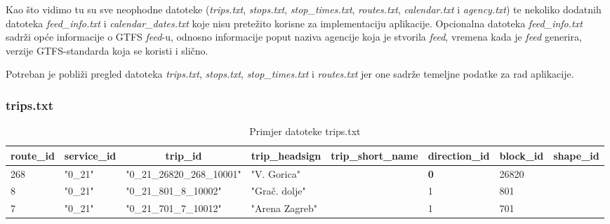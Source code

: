 \documentclass[zavrsnirad]{fer}
\begin{document}
Kao što vidimo tu su sve neophodne datoteke (\textit{trips.txt}, \textit{stops.txt}, \textit{stop\_times.txt}, \newline\textit{routes.txt}, \textit{calendar.txt} i \textit{agency.txt}) te nekoliko dodatnih datoteka \textit{feed\_info.txt} i \newline\textit{calendar\_dates.txt} koje nisu pretežito korisne za implementaciju aplikacije. Opcionalna datoteka \textit{feed\_info.txt} sadrži opće informacije o GTFS \textit{feed}-u, odnosno  informacije poput naziva agencije koja je stvorila \textit{feed}, vremena kada je \textit{feed} generira, verzije GTFS-standarda koja se koristi i slično.

Potreban je pobliži pregled datoteka \textit{trips.txt}, \textit{stops.txt}, \textit{stop\_times.txt} i \textit{routes.txt} jer one sadrže temeljne podatke za rad aplikacije.

\subsubsection{trips.txt}

\begin{table}[htb]
	\begin{adjustbox}{width=\columnwidth,center}
	\begin{tabular}{l|l|l|l|l|l|l|l}
		\hline
		\multicolumn{1}{c|}{\textbf{route\_id}} & \multicolumn{1}{c|}{\textbf{service\_id}} & \multicolumn{1}{c|}{\textbf{trip\_id}} & \multicolumn{1}{c|}{\textbf{trip\_headsign}} & \multicolumn{1}{c|}{\textbf{trip\_short\_name}} & \multicolumn{1}{c|}{\textbf{direction\_id}} & \multicolumn{1}{c|}{\textbf{block\_id}} & \multicolumn{1}{c}{\textbf{shape\_id}} \\ \hline
		268 & "0\_21" & "0\_21\_26820\_268\_10001" & "V. Gorica" &  & \textbf{0} & 26820 &  \\ \hline
		8 & "0\_21" & "0\_21\_801\_8\_10002" & "Grač. dolje" & \textbf{} & 1 & 801 &  \\ \hline
		7 & "0\_21" & "0\_21\_701\_7\_10012" & "Arena Zagreb" & \textbf{} & 1 & 701 &  \\ \hline
	\end{tabular}
	\end{adjustbox}
	\caption{Primjer datoteke trips.txt}
	\label{tbl:trips}
\end{table}
\end{document}
